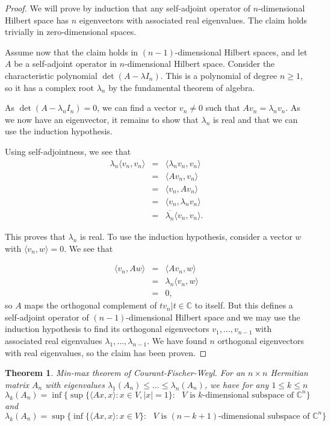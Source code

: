 \documentclass[12pt,a4paper,leqno]{report}
\newcommand{\C}{\mathbb{C}}
\theoremstyle{plain}
\newtheorem{theo}[equation]{Theorem}
\theoremstyle{definition}
\theoremstyle{remark}
\begin{document}
\begin{proof}
We will prove by induction that any self-adjoint operator of $n$-dimensional Hilbert space has $n$ eigenvectors with associated real eigenvalues. The claim holds trivially in zero-dimensional spaces.

Assume now that the claim holds in $(n-1)$-dimensional Hilbert spaces, and let $A$ be a self-adjoint operator in $n$-dimensional Hilbert space. Consider the characteristic polynomial $\det(A-\lambda I_n)$. This is a polynomial of degree $n\geq 1$, so it has a complex root $\lambda_n$ by the fundamental theorem of algebra.

As $\det(A-\lambda_n I_n)=0$, we can find a vector $v_n \neq 0$ such that $Av_n = \lambda_n v_n$. As we now have an eigenvector, it remains to show that $\lambda_n$ is real and that we can use the induction hypothesis.

Using self-adjointness, we see that
\begin{eqnarray*}
\lambda_n \langle v_n,v_n \rangle & = &
\langle \lambda_n v_n,v_n \rangle\\
& = & \langle Av_n,v_n \rangle \\
& = & \langle v_n,Av_n \rangle \\
& = &\langle v_n,\lambda_n v_n \rangle\\
& = & \overline{\lambda_n} \langle v_n, v_n \rangle.
\end{eqnarray*}

This proves that $\lambda_n$ is real. To use the induction hypothesis, consider a vector $w$ with $\langle v_n,w \rangle = 0$. We see that

\begin{eqnarray*}
\langle v_n, Aw \rangle & = & \langle Av_n , w \rangle\\
& = & \lambda_n \langle v_n,w \rangle\\
& = & 0,
\end{eqnarray*}
so $A$ maps the orthogonal complement of ${tv_n | t\in \C}$ to itself. But this defines a self-adjoint operator of $(n-1)$-dimensional Hilbert space and we may use the induction hypothesis to find its orthogonal eigenvectors $v_1, \ldots, v_{n-1}$ with associated real eigenvalues $\lambda_1, \ldots, \lambda_{n-1}$.
We have found $n$ orthogonal eigenvectors with real eigenvalues, so the claim has been proven.
\end{proof}

\begin{theo}
Min-max theorem of Courant-Fischer-Weyl. For an $n \times n$ Hermitian matrix $A_n$ with eigenvalues $\lambda_1(A_n) \leq \ldots \leq \lambda_n(A_n)$, we have for any $1\leq k \leq n$
\begin{equation*}
\lambda_k(A_n) = \inf \{ \sup\{\langle Ax,x \rangle : x \in V, |x|=1\} : \textrm{ $V$ is $k$-dimensional subspace of $\C^n$} \}
\end{equation*}
and
\begin{equation*}
\lambda_k(A_n) = \sup \{ \inf\{\langle Ax,x \rangle : x \in V\} : \textrm{ $V$ is $(n-k+1)$-dimensional subspace of $\C^n$} \}
\end{equation*}
\end{theo}
\end{document}
